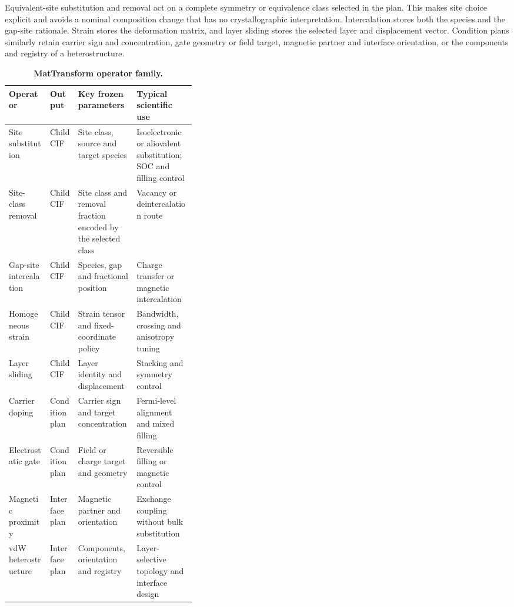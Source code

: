 Equivalent-site substitution and removal act on a complete symmetry or equivalence class selected in the plan.  This makes site choice explicit and avoids a nominal composition change that has no crystallographic interpretation.  Intercalation stores both the species and the gap-site rationale.  Strain stores the deformation matrix, and layer sliding stores the selected layer and displacement vector.  Condition plans similarly retain carrier sign and concentration, gate geometry or field target, magnetic partner and interface orientation, or the components and registry of a heterostructure.

\begin{table}[t]
    \centering
    \caption{\textbf{MatTransform operator family.}}
    \label{tab:operators}
    \small
    \setlength{\tabcolsep}{3.8pt}
    \renewcommand{\arraystretch}{1.12}
    \begin{tabularx}{\linewidth}{>{\raggedright\arraybackslash}p{0.22\linewidth}>{\raggedright\arraybackslash}p{0.15\linewidth}XX}
        \toprule
        \normalfont\textbf{Operator} & \textbf{Output} & \textbf{Key frozen parameters} & \textbf{Typical scientific use} \\
        \midrule
        Site substitution & Child CIF & Site class, source and target species & Isoelectronic or aliovalent substitution; SOC and filling control \\
        Site-class removal & Child CIF & Site class and removal fraction encoded by the selected class & Vacancy or deintercalation route \\
        Gap-site intercalation & Child CIF & Species, gap and fractional position & Charge transfer or magnetic intercalation \\
        Homogeneous strain & Child CIF & Strain tensor and fixed-coordinate policy & Bandwidth, crossing and anisotropy tuning \\
        Layer sliding & Child CIF & Layer identity and displacement & Stacking and symmetry control \\
        Carrier doping & Condition plan & Carrier sign and target concentration & Fermi-level alignment and mixed filling \\
        Electrostatic gate & Condition plan & Field or charge target and geometry & Reversible filling or magnetic control \\
        Magnetic proximity & Interface plan & Magnetic partner and orientation & Exchange coupling without bulk substitution \\
        vdW heterostructure & Interface plan & Components, orientation and registry & Layer-selective topology and interface design \\
        \bottomrule
    \end{tabularx}
\end{table}

